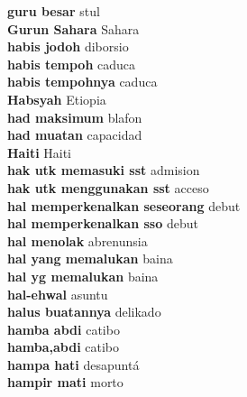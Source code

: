 \textbf{ guru besar  } stul \\
\textbf{ Gurun Sahara  } Sahara \\
\textbf{ habis jodoh  } diborsio \\
\textbf{ habis tempoh  } caduca \\
\textbf{ habis tempohnya  } caduca \\
\textbf{ Habsyah  } Etiopia \\
\textbf{ had maksimum  } blafon \\
\textbf{ had muatan  } capacidad \\
\textbf{ Haiti  } Haiti \\
\textbf{ hak utk memasuki sst  } admision \\
\textbf{ hak utk menggunakan sst  } acceso \\
\textbf{ hal memperkenalkan seseorang  } debut \\
\textbf{ hal memperkenalkan sso  } debut \\
\textbf{ hal menolak  } abrenunsia \\
\textbf{ hal yang memalukan  } baina \\
\textbf{ hal yg memalukan  } baina \\
\textbf{ hal-ehwal  } asuntu \\
\textbf{ halus buatannya  } delikado \\
\textbf{ hamba abdi  } catibo \\
\textbf{ hamba,abdi  } catibo \\
\textbf{ hampa hati  } desapuntá \\
\textbf{ hampir mati  } morto \\
